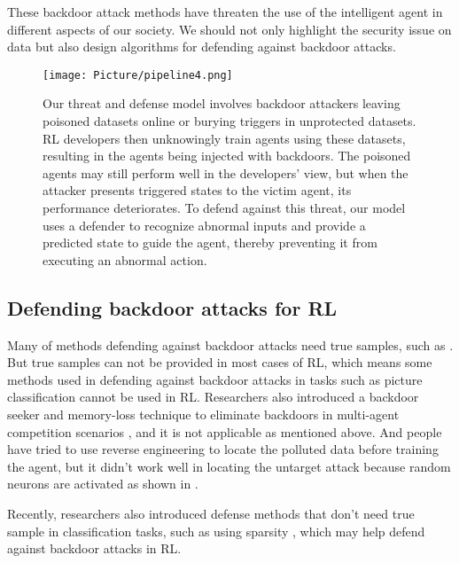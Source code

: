 \documentclass[letterpaper, 10 pt, conference]{ieeeconf}  %
\begin{document}
These backdoor attack methods have threaten the use of the intelligent agent in different aspects of our society. We should not only highlight the security issue on data but also design algorithms for defending against backdoor attacks.

\begin{figure}
    \centering
    \texttt{[image: Picture/pipeline4.png]}
    \caption{Our threat and defense model involves backdoor attackers leaving poisoned datasets online or burying triggers in unprotected datasets. RL developers then unknowingly train agents using these datasets, resulting in the agents being injected with backdoors. The poisoned agents may still perform well in the developers' view, but when the attacker presents triggered states to the victim agent, its performance deteriorates. To defend against this threat, our model uses a defender to recognize abnormal inputs and provide a predicted state to guide the agent, thereby preventing it from executing an abnormal action.}
    \label{fig:TDPipeline}
\end{figure}

\subsection{Defending backdoor attacks for RL}
Many of methods defending against backdoor attacks need true samples, such as \cite{defentrusam1,defentrusam2}. But true samples can not be provided in most cases of RL, which means some methods used in defending against backdoor attacks in tasks such as picture classification cannot be used in RL. Researchers also introduced a backdoor seeker and memory-loss technique to eliminate backdoors in multi-agent competition scenarios \cite{trojanSeeker}, and it is not applicable as mentioned above. And people have tried to use reverse engineering \cite{neuralcleanse} to locate the polluted data before training the agent, but it didn't work well in locating the untarget attack because random neurons are activated as shown in \cite{trojdrl}.



Recently, researchers also introduced defense methods that don't need true sample in classification tasks, such as using sparsity \cite{sparsity}, which may help defend against backdoor attacks in RL.
\iffalse
\subsection{Defense method for multi-agent backdoor attack}
To tackle backdoor attack threats in the multi-agent scenario, previous study has proposed to detect the backdoor and apply memory loss technique to cleanse the backdoor in the victim agent’s policy \cite{trojanSeeker}. In the detection stage, a seeker agent which gets feedback from a designed reward function is utilised to find the abnormal behaviour of the victim agent $a_t$ under the state $s_t$. Then, in the cleanse process, it uses a memory-loss method to retrain the agent. If we want to use this method in the single-agent scenario, 
\fi
\end{document}
